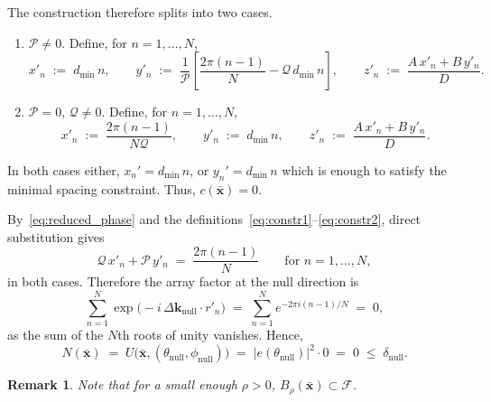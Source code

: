 \documentclass[11pt,letterpaper]{article}
\theoremstyle{definition}
\theoremstyle{plain}
\newtheorem{remark}[theorem]{Remark}
\begin{document}
\medskip
The construction therefore splits into two cases.

\medskip
\begin{enumerate}
\item[Case~1:] $\mathcal{P}\neq 0$.\quad
Define, for $n=1,\ldots,N$,
\begin{equation}\label{eq:constr1}
    x'_n \;:=\; d_{\min}\,n,
    \qquad
    y'_n \;:=\; \frac{1}{\mathcal{P}}\!\left[
                  \frac{2\pi(n-1)}{N} - \mathcal{Q}\,d_{\min}\,n
                \right],
    \qquad
    z'_n \;:=\; \frac{A\,x'_n+B\,y'_n}{D}.
\end{equation}

\item[Case~2:] $\mathcal{P}=0$, $\mathcal{Q}\neq 0$.\quad
Define, for $n=1,\ldots,N$,
\begin{equation}\label{eq:constr2}
    x'_n \;:=\; \frac{2\pi(n-1)}{N\mathcal{Q}},
    \qquad
    y'_n \;:=\; d_{\min}\,n,
    \qquad
    z'_n \;:=\; \frac{A\,x'_n+B\,y'_n}{D}.
\end{equation}

\end{enumerate}

In both cases either, $x_n' = d_{\min}\,n$, or $y_n' = d_{\min}\,n$ which is enough to satisfy the minimal spacing constraint. Thus, $c(\mathbf{\bar{x}}) = 0$.

By~\eqref{eq:reduced_phase} and the definitions~\eqref{eq:constr1}--\eqref{eq:constr2},
direct substitution gives
\[
    \mathcal{Q}\,x'_n + \mathcal{P}\,y'_n
    \;=\;
    \frac{2\pi(n-1)}{N}
    \qquad\text{for }n=1,\ldots,N,
\]
in both cases. Therefore the array factor at the null direction is
\[
    \sum_{n=1}^{N}
    \exp\!\bigl(-i\,\Delta\mathbf{k}_{\mathrm{null}}\cdot r'_n\bigr) \;=\; \sum_{n=1}^{N}e^{-2\pi i(n-1)/N}\;=\; 0,
\]
as the sum of the $N$th roots of unity vanishes.
Hence,
\[
   N(\mathbf{\bar{x}})
    \;=\;
    U\!\bigl(\mathbf{\bar{x}},(\theta_{\mathrm{null}},\phi_{\mathrm{null}})\bigr)
    \;=\;
    \bigl|e(\theta_{\mathrm{null}})\bigr|^2\cdot 0
    \;=\; 0
    \;\leq\;
    \delta_{\mathrm{null}}.
\]

\begin{remark}
\label{ball_inside_F}
   Note that for a  small enough $\rho>0$,  $B_{\rho}(\mathbf{\bar{x}})\subset\mathcal{F}$.
\end{remark}

\end{document}
